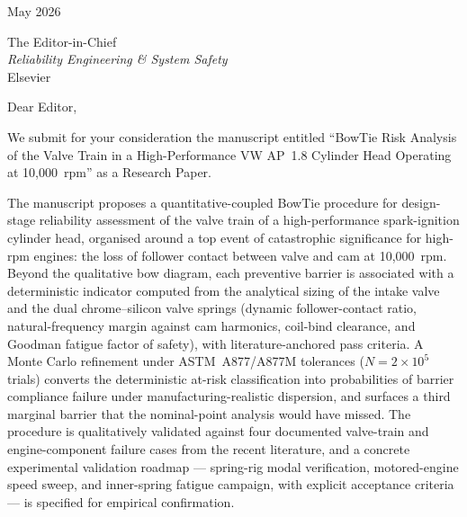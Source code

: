 \documentclass[11pt,a4paper]{article}
\begin{document}
 May 2026

\bigskip

\noindent The Editor-in-Chief\\
\emph{Reliability Engineering \& System Safety}\\
Elsevier

\bigskip

\noindent Dear Editor,

We submit for your consideration the manuscript entitled ``BowTie Risk
Analysis of the Valve Train in a High-Performance VW AP~1.8 Cylinder
Head Operating at 10{,}000~rpm'' as a Research Paper.

The manuscript proposes a quantitative-coupled BowTie procedure for
design-stage reliability assessment of the valve train of a
high-performance spark-ignition cylinder head, organised around a
top event of catastrophic significance for high-rpm engines: the loss
of follower contact between valve and cam at 10{,}000~rpm. Beyond the
qualitative bow diagram, each preventive barrier is associated with a
deterministic indicator computed from the analytical sizing of the
intake valve and the dual chrome--silicon valve springs (dynamic
follower-contact ratio, natural-frequency margin against cam
harmonics, coil-bind clearance, and Goodman fatigue factor of safety),
with literature-anchored pass criteria. A Monte Carlo refinement
under ASTM~A877/A877M tolerances ($N=2\times 10^{5}$ trials) converts
the deterministic at-risk classification into probabilities of barrier
compliance failure under manufacturing-realistic dispersion, and
surfaces a third marginal barrier that the nominal-point analysis
would have missed. The procedure is qualitatively validated against
four documented valve-train and engine-component failure cases from
the recent literature, and a concrete experimental validation
roadmap --- spring-rig modal verification, motored-engine speed
sweep, and inner-spring fatigue campaign, with explicit acceptance
criteria --- is specified for empirical confirmation.
\end{document}
